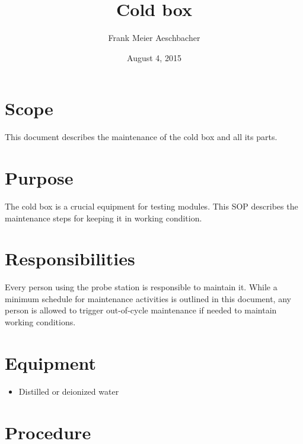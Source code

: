 \documentclass[12pt]{unlsilabsop}
\title{Cold box}
\date{August 4, 2015}
\author{Frank Meier Aeschbacher}
\begin{document}
\maketitle

\section{Scope}
This document describes the maintenance of the cold box and all its parts.

\section{Purpose}
The cold box is a crucial equipment for testing modules. This SOP describes the maintenance steps for keeping it in working condition.


\section{Responsibilities}
Every person using the probe station is responsible to maintain it. While a minimum schedule for maintenance activities is outlined in this document, any person is allowed to trigger out-of-cycle maintenance if needed to maintain working conditions.

\section{Equipment}

\begin{itemize}
    \item Distilled or deionized water
\end{itemize}


\section{Procedure}
\end{document}
